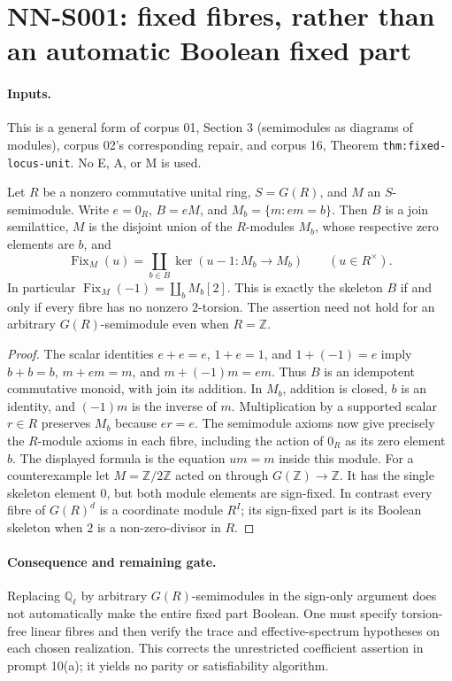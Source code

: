 \section{NN-S001: fixed fibres, rather than an automatic Boolean fixed part}
\label{sec:NN-S001}

\paragraph{Inputs.} This is a general form of corpus 01, Section 3
(semimodules as diagrams of modules), corpus 02's corresponding repair,
and corpus 16, Theorem \texttt{thm:fixed-locus-unit}. No E, A, or M is used.

\begin{theorem}[NN-S001]
Let $R$ be a nonzero commutative unital ring, $S=G(R)$, and $M$ an
$S$-semimodule. Write $e=0_R$, $B=eM$, and $M_b=\{m:em=b\}$.
Then $B$ is a join semilattice, $M$ is the disjoint union of the
$R$-modules $M_b$, whose respective zero elements are $b$, and
\[
 \operatorname{Fix}_M(u)=\coprod_{b\in B}\ker(u-1:M_b\longrightarrow M_b)
 \qquad(u\in R^\times).
\]
In particular $\operatorname{Fix}_M(-1)=\coprod_b M_b[2]$.
This is exactly the skeleton $B$ if and only if every fibre has no
nonzero $2$-torsion. The assertion need not hold for an arbitrary
$G(R)$-semimodule even when $R=\mathbb Z$.
\end{theorem}

\begin{proof}
The scalar identities $e+e=e$, $1+e=1$, and $1+(-1)=e$ imply
$b+b=b$, $m+em=m$, and $m+(-1)m=em$. Thus $B$ is an idempotent
commutative monoid, with join its addition. In $M_b$, addition is closed,
$b$ is an identity, and $(-1)m$ is the inverse of $m$. Multiplication
by a supported scalar $r\in R$ preserves $M_b$ because $er=e$.
The semimodule axioms now give precisely the $R$-module axioms in
each fibre, including the action of $0_R$ as its zero element $b$.
The displayed formula is the equation $um=m$ inside this module.
For a counterexample let $M=\mathbb Z/2\mathbb Z$ acted on through
$G(\mathbb Z)\to\mathbb Z$. It has the single skeleton element $0$,
but both module elements are sign-fixed. In contrast every fibre of
$G(R)^d$ is a coordinate module $R^I$; its sign-fixed part is its
Boolean skeleton when $2$ is a non-zero-divisor in $R$.
\end{proof}

\paragraph{Consequence and remaining gate.}
Replacing $\mathbb Q_\ell$ by arbitrary $G(R)$-semimodules in the
sign-only argument does not automatically make the entire fixed part
Boolean. One must specify torsion-free linear fibres and then verify
the trace and effective-spectrum hypotheses on each chosen realization.
This corrects the unrestricted coefficient assertion in prompt 10(a);
it yields no parity or satisfiability algorithm.

